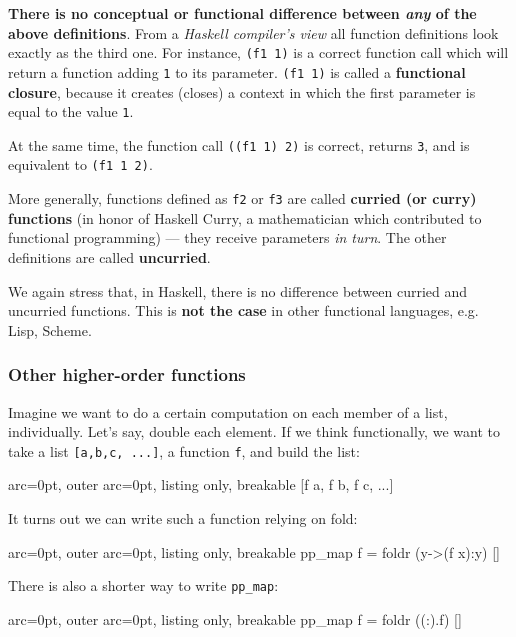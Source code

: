 \textbf{There is no conceptual or functional difference between \textit{any} of the above definitions}. From a \textit{Haskell compiler's view} all function definitions look exactly as the third one. For instance, \texttt{(f1 1)} is a correct function call which will return a function adding \texttt{1} to its parameter. \texttt{(f1 1)} is called a \textbf{functional closure}, because it creates (closes) a context in which the first parameter is equal to the value \texttt{1}.

At the same time, the function call \texttt{((f1 1) 2)} is correct, returns \texttt{3}, and is equivalent to \texttt{(f1 1 2)}.

More generally, functions defined as \texttt{f2} or \texttt{f3} are called \textbf{curried (or curry) functions} (in honor of Haskell Curry, a mathematician which contributed to functional programming) --- they receive parameters \textit{in turn}. The other definitions are called \textbf{uncurried}.

We again stress that, in Haskell, there is no difference between curried and uncurried functions. This is \textbf{not the case} in other functional languages, e.g. Lisp, Scheme.

\subsubsection*{ Other higher-order functions }

Imagine we want to do a certain computation on each member of a list, individually. Let's say, double each element. If we think functionally, we want to take a list \texttt{[a,b,c, ...]}, a function \texttt{f}, and build the list:


\begin{tcblisting}{ arc=0pt, outer arc=0pt, listing only, breakable}
[f a, f b, f c, ...]

\end{tcblisting}


It turns out we can write such a function relying on fold:


\begin{tcblisting}{ arc=0pt, outer arc=0pt, listing only, breakable}
pp_map f = foldr (\x y->(f x):y) []

\end{tcblisting}



There is also a shorter way to write \texttt{pp\_map}:

\begin{tcblisting}{ arc=0pt, outer arc=0pt, listing only, breakable}
pp_map f = foldr ((:).f) []

\end{tcblisting}


